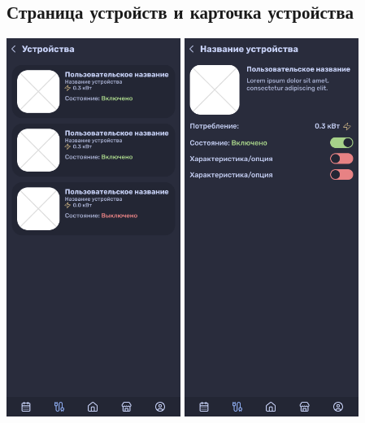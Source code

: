 \documentclass[a4paper,12pt]{article}
\begin{document}
\subsection*{Страница устройств и карточка устройства}
\begin{center}
  \includegraphics[width=0.425\textwidth]{pics/Devices Page.png}
  \includegraphics[width=0.425\textwidth]{pics/Single Device Page.png}
\end{center}
\end{document}
